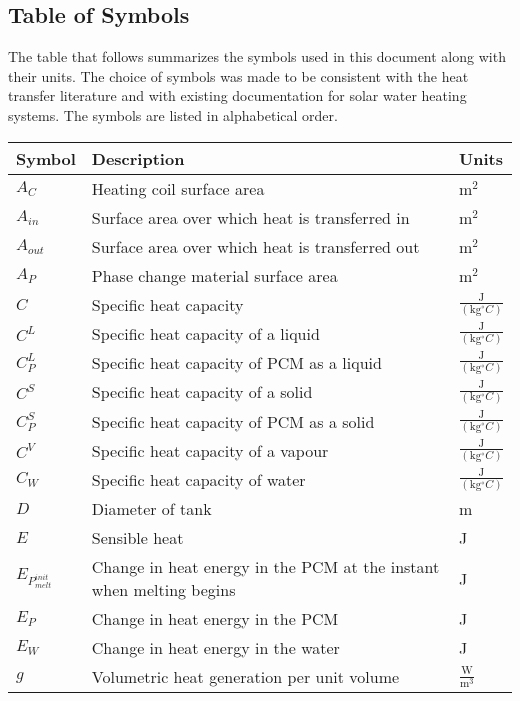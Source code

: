\documentclass[12pt]{article}
\begin{document}
\subsection{Table of Symbols}
\label{Sec:TablofSymb}
The table that follows summarizes the symbols used in this document along with their units. The choice of symbols was made to be consistent with the heat transfer literature and with existing documentation for solar water heating systems. The symbols are listed in alphabetical order.
\begin{longtable*}{l l l}
\toprule
Symbol & Description & Units
\\
\midrule
$A_{C}$ & Heating coil surface area & $\text{m}^{2}$
\\
$A_{in}$ & Surface area over which heat is transferred in & $\text{m}^{2}$
\\
$A_{out}$ & Surface area over which heat is transferred out & $\text{m}^{2}$
\\
$A_{P}$ & Phase change material surface area & $\text{m}^{2}$
\\
$C$ & Specific heat capacity & $\frac{\text{J}}{(\text{kg}{}^{\circ}C)}$
\\
$C^{L}$ & Specific heat capacity of a liquid & $\frac{\text{J}}{(\text{kg}{}^{\circ}C)}$
\\
$C_{P}^{L}$ & Specific heat capacity of PCM as a liquid & $\frac{\text{J}}{(\text{kg}{}^{\circ}C)}$
\\
$C^{S}$ & Specific heat capacity of a solid & $\frac{\text{J}}{(\text{kg}{}^{\circ}C)}$
\\
$C_{P}^{S}$ & Specific heat capacity of PCM as a solid & $\frac{\text{J}}{(\text{kg}{}^{\circ}C)}$
\\
$C^{V}$ & Specific heat capacity of a vapour & $\frac{\text{J}}{(\text{kg}{}^{\circ}C)}$
\\
$C_{W}$ & Specific heat capacity of water & $\frac{\text{J}}{(\text{kg}{}^{\circ}C)}$
\\
$D$ & Diameter of tank & m
\\
$E$ & Sensible heat & J
\\
$E_{P}_{melt}^{init}$ & Change in heat energy in the PCM at the instant when melting begins & J
\\
$E_{P}$ & Change in heat energy in the PCM & J
\\
$E_{W}$ & Change in heat energy in the water & J
\\
$g$ & Volumetric heat generation per unit volume & $\frac{\text{W}}{\text{m}^{3}}$
\\

\end{longtable*}
\end{document}
